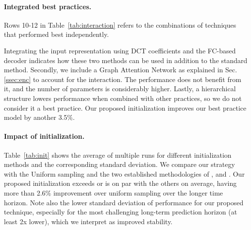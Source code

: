 \documentclass[10pt,twocolumn,letterpaper]{article}
\begin{document}
\paragraph{Integrated best practices.}
Rows 10-12 in Table~\ref{tab:interaction} refers to the combinations of techniques that performed best independently.

Integrating the input representation using DCT coefficients and the FC-based decoder indicates how these two methods can be used in addition to the standard method. Secondly, we include a Graph Attention Network as explained in Sec. \ref{ssec:enc} to account for the interaction. The performance does not benefit from it, and the number of parameters is considerably higher.
Lastly, a hierarchical structure lowers performance when combined with other practices, so we do not consider it a best practice. Our proposed initialization improves our best practice model by another 3.5\%.


\paragraph{Impact of initialization.}\label{ssec:init_discussion}
Table~\ref{tab:init} shows the average of multiple runs for different initialization methods and the corresponding standard deviation. We compare our strategy with the Uniform sampling and the two established methodologies of \cite{glorot10}, and \cite{he15}. Our proposed initialization exceeds or is on par with the others on average, having more than 2.6\% improvement over uniform sampling over the longer time horizon. Note also the lower standard deviation of performance for our proposed technique, especially for the most challenging long-term prediction horizon (at least 2x lower), which we interpret as improved stability.
\end{document}
